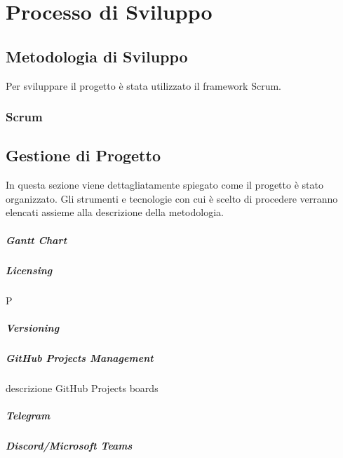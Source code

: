 \chapter{Processo di Sviluppo}


\section{Metodologia di Sviluppo}
Per sviluppare il progetto è stata utilizzato il framework Scrum. 
    \subsection{Scrum}
    
    

\section{Gestione di Progetto}
In questa sezione viene dettagliatamente spiegato come il progetto è stato organizzato. Gli strumenti e tecnologie con cui è scelto di procedere verranno elencati assieme alla descrizione della metodologia.
    \paragraph{Gantt Chart} 
    
    \paragraph{Licensing} P
    
    \paragraph{Versioning}
    
    \paragraph{GitHub Projects Management}
    descrizione GitHub Projects boards 
    
    \paragraph{Telegram}
    
    \paragraph{Discord/Microsoft Teams}
     

